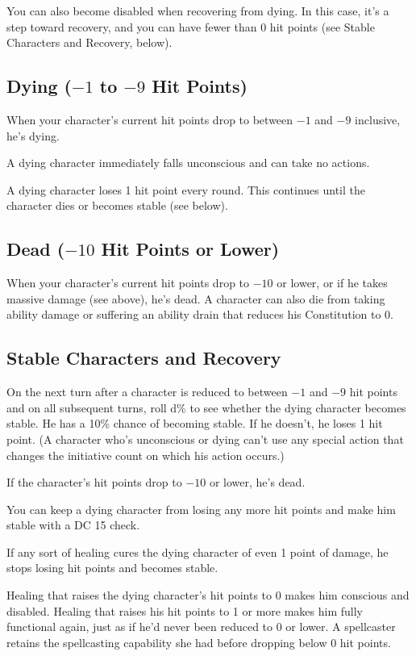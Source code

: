 You can also become disabled when recovering from dying. In this case, it's a step toward recovery, and you can have fewer than 0 hit points (see Stable Characters and Recovery, below).

\subsection{Dying ($-1$ to $-9$ Hit Points)}
When your character's current hit points drop to between $-1$ and $-9$ inclusive, he's dying.

A dying character immediately falls unconscious and can take no actions.

A dying character loses 1 hit point every round. This continues until the character dies or becomes stable (see below).

\subsection{Dead ($-10$ Hit Points or Lower)}
When your character's current hit points drop to $-10$ or lower, or if he takes massive damage (see above), he's dead. A character can also die from taking ability damage or suffering an ability drain that reduces his Constitution to 0.
\subsection{Stable Characters and Recovery}
On the next turn after a character is reduced to between $-1$ and $-9$ hit points and on all subsequent turns, roll d\% to see whether the dying character becomes stable. He has a 10\% chance of becoming stable. If he doesn't, he loses 1 hit point. (A character who's unconscious or dying can't use any special action that changes the initiative count on which his action occurs.)

If the character's hit points drop to $-10$ or lower, he's dead.

You can keep a dying character from losing any more hit points and make him stable with a DC 15  check.

If any sort of healing cures the dying character of even 1 point of damage, he stops losing hit points and becomes stable.

Healing that raises the dying character's hit points to 0 makes him conscious and disabled. Healing that raises his hit points to 1 or more makes him fully functional again, just as if he'd never been reduced to 0 or lower. A spellcaster retains the spellcasting capability she had before dropping below 0 hit points.

